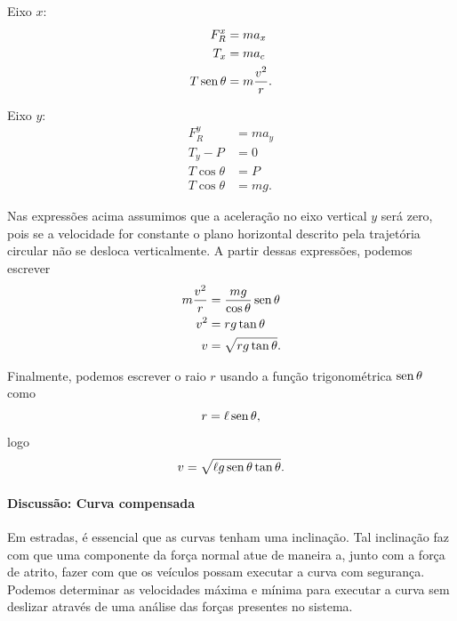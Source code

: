 \begin{description}
    \item{Eixo $x$:}
        \begin{align}
            F_R^x &= m a_x \\
            T_x &= m a_c \\
            T \operatorname{sen}\theta &= m \frac{v^2}{r}.
        \end{align} 
    \item{Eixo $y$:}
        \begin{align}
            F_R^y &= m a_y \\
            T_y - P &= 0 \\
            T \cos\theta &= P \\
            T \cos\theta &= mg.
        \end{align}
\end{description}
%
Nas expressões acima assumimos que a aceleração no eixo vertical $y$ será zero, pois se a velocidade for constante o plano horizontal descrito pela trajetória circular não se desloca verticalmente. A partir dessas expressões, podemos escrever
\begin{align}
    m\frac{v^2}{r} &= \frac{mg}{\cos\theta} \operatorname{sen}\theta \\
    v^2 &= rg \tan\theta \\
    v &= \sqrt{rg\tan\theta}.
\end{align}

Finalmente, podemos escrever o raio $r$ usando a função trigonométrica $\operatorname{sen}\theta$ como
\begin{equation}
    r = \ell \operatorname{sen}\theta,
\end{equation}
%
logo
\begin{equation}
    v = \sqrt{\ell g \operatorname{sen}\theta\tan\theta}.
\end{equation}

\paragraph{Discussão: Curva compensada}

Em estradas, é essencial que as curvas tenham uma inclinação. Tal inclinação faz com que uma componente da força normal atue de maneira a, junto com a força de atrito, fazer com que os veículos possam executar a curva com segurança. Podemos determinar as velocidades máxima e mínima para executar a curva sem deslizar através de uma análise das forças presentes no sistema.

